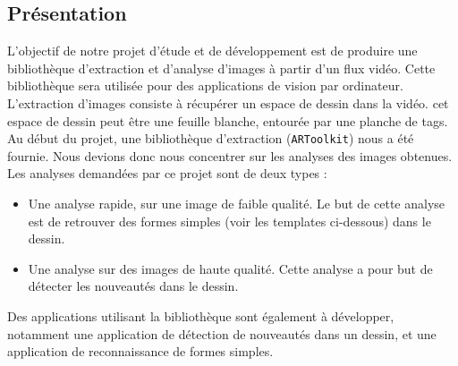 \subsection{Présentation}

L'objectif de notre projet d'étude et de développement est de produire une bibliothèque d'extraction et d'analyse d'images à partir d'un flux vidéo. Cette bibliothèque sera utilisée pour des applications de vision par ordinateur.\\

L'extraction d'images consiste à récupérer un espace de dessin dans la vidéo. cet espace de dessin peut être une feuille blanche, entourée par une planche de tags. Au début du projet, une bibliothèque d'extraction (\texttt{ARToolkit}) nous a été fournie. Nous devions donc nous concentrer sur les analyses des images obtenues.\\

Les analyses demandées par ce projet sont de deux types : 
\begin{itemize}
\item Une analyse rapide, sur une image de faible qualité. Le but de cette analyse est de retrouver des formes simples (voir les templates ci-dessous) dans le dessin.
\item Une analyse sur des images de haute qualité. Cette analyse a pour but de détecter les nouveautés dans le dessin.\\
\end{itemize}
Des applications utilisant la bibliothèque sont également à développer, notamment une application de détection de nouveautés dans un dessin, et une application de reconnaissance de formes simples.